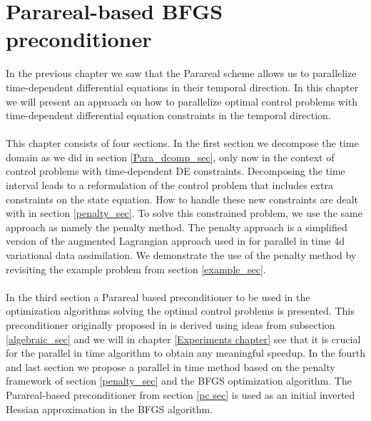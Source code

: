 \chapter{Parareal-based BFGS preconditioner} \label{method_chap}
In the previous chapter we saw that the Parareal scheme allows us to parallelize time-dependent differential equations in their temporal direction. In this chapter we will present an approach on how to parallelize optimal control problems with time-dependent differential equation constraints in the temporal direction. 
\\
\\
This chapter consists of four sections. In the first section we decompose the time domain as we did in section \ref{Para_dcomp_sec}, only now in the context of control problems with time-dependent DE constraints. Decomposing the time interval leads to a reformulation of the control problem that includes extra constraints on the state equation. How to handle these new constraints are dealt with in section \ref{penalty_sec}. To solve this constrained problem, we use the same approach as \cite{maday2002parareal} namely the penalty method. The penalty approach is a simplified version of the augmented Lagrangian approach used in \cite{rao2016time} for parallel in time 4d variational data assimilation. We demonstrate the use of the penalty method by revisiting the example problem from section \ref{example_sec}.
\\
\\
In the third section a Parareal based preconditioner to be used in the optimization algorithms solving the optimal control problems is presented. This preconditioner originally proposed in \cite{maday2002parareal} is derived using ideas from subsection \ref{algebraic_sec} and we will in chapter \ref{Experiments chapter} see that it is crucial for the parallel in time algorithm to obtain any meaningful speedup. In the fourth and last section we propose a parallel in time method based on the penalty framework of section \ref{penalty_sec} and the BFGS optimization algorithm. The Parareal-based preconditioner from section \ref{pc sec} is used as an initial inverted Hessian approximation in the BFGS algorithm.
